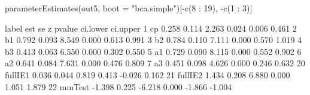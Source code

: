 \begin{Schunk}
\begin{Sinput}
 parameterEstimates(out5, 
                    boot = "bca.simple")[-c(8 : 19), -c(1 : 3)]
\end{Sinput}
\begin{Soutput}
     label    est    se      z pvalue ci.lower ci.upper
1       cp  0.258 0.114  2.263  0.024    0.006    0.461
2       b1  0.792 0.093  8.549  0.000    0.613    0.991
3       b2  0.784 0.110  7.111  0.000    0.570    1.019
4       b3  0.413 0.063  6.550  0.000    0.302    0.550
5       a1  0.729 0.090  8.115  0.000    0.552    0.902
6       a2  0.641 0.084  7.631  0.000    0.476    0.809
7       a3  0.451 0.098  4.626  0.000    0.246    0.632
20 fullIE1  0.036 0.044  0.819  0.413   -0.026    0.162
21 fullIE2  1.434 0.208  6.880  0.000    1.051    1.879
22  mmTest -1.398 0.225 -6.218  0.000   -1.866   -1.004
\end{Soutput}
\end{Schunk}
